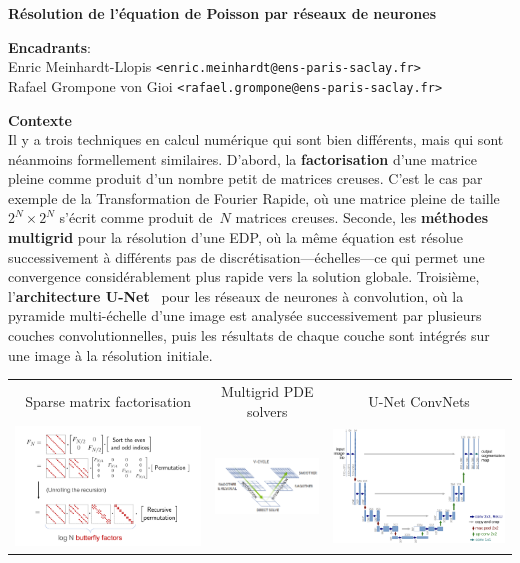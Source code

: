 \documentclass[a4paper,11pt]{article}
\begin{document}
\thispagestyle{empty}

{\bf
	Résolution de l'équation de Poisson par réseaux de neurones
}

{\bf Encadrants}:\\
Enric Meinhardt-Llopis \verb+<enric.meinhardt@ens-paris-saclay.fr>+\\
Rafael Grompone von Gioi \verb+<rafael.grompone@ens-paris-saclay.fr>+

{\bf Contexte}\\
Il y a trois techniques en calcul numérique qui sont bien différents, mais qui
sont néanmoins formellement similaires.  D'abord, la {\bf factorisation}
d'une matrice pleine comme produit d'un nombre petit de matrices creuses.
C'est le cas par exemple de la Transformation de Fourier Rapide, où une matrice
pleine de taille~$2^N\times2^N$ s'écrit comme produit de~$N$ matrices creuses.
Seconde, les {\bf méthodes multigrid} pour la résolution d'une EDP, où la même
équation est résolue successivement à différents pas de
discrétisation---échelles---ce qui permet une convergence considérablement plus
rapide vers la solution globale.  Troisième, l'{\bf architecture
U-Net}~\cite{unet} pour les réseaux de neurones à convolution, où la pyramide
multi-échelle d'une image est analysée successivement par plusieurs couches
convolutionnelles, puis les résultats de chaque couche sont intégrés sur une
image à la résolution initiale.

\begin{tabular}{ccc}
	\sf\color{blue} Sparse matrix factorisation &
	\sf\color{blue} Multigrid PDE solvers&
	\sf\color{blue} U-Net ConvNets\\
	\includegraphics[width=0.32\linewidth]{f/butterflies.png} &
	\includegraphics[width=0.32\linewidth]{f/vcycle.png} &
	\includegraphics[width=0.32\linewidth]{f/cunet.png} \\
\end{tabular}
\end{document}
